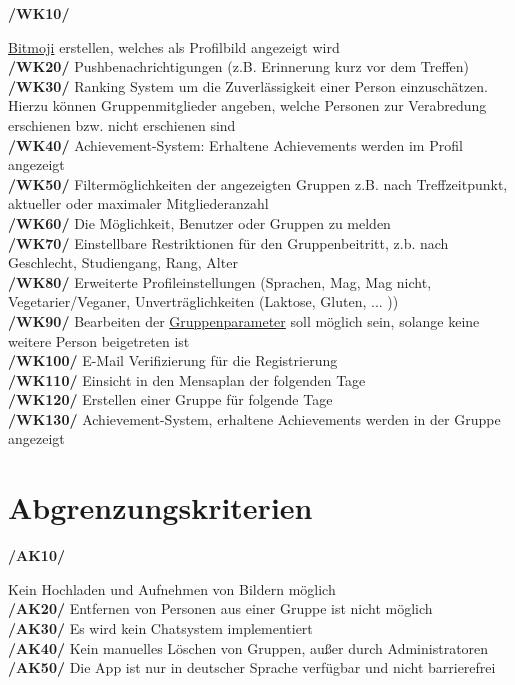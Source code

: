 \documentclass[a4paper]{scrreprt}
\begin{document}
\begin{addmargin}[25pt]{0pt}
\hypertarget{wk10}{\textbf{/WK10/}} \hyperlink{label7}{Bitmoji} erstellen, welches als Profilbild angezeigt wird \\
\hypertarget{wk20}{\textbf{/WK20/}} Pushbenachrichtigungen (z.B. Erinnerung kurz vor dem Treffen) \\
\hypertarget{wk30}{\textbf{/WK30/}} Ranking System um die Zuverlässigkeit einer Person einzuschätzen.\\
Hierzu können Gruppenmitglieder angeben, welche Personen zur Verabredung erschienen bzw. nicht erschienen sind\\
\hypertarget{wk40}{\textbf{/WK40/}} Achievement-System: Erhaltene Achievements werden im Profil angezeigt\\
\hypertarget{wk50}{\textbf{/WK50/}} Filtermöglichkeiten der angezeigten Gruppen z.B. nach Treffzeitpunkt, aktueller oder maximaler Mitgliederanzahl \\
\hypertarget{wk60}{\textbf{/WK60/}} Die Möglichkeit, Benutzer oder Gruppen zu melden\\
\hypertarget{wk70}{\textbf{/WK70/}} Einstellbare Restriktionen für den Gruppenbeitritt, z.b. nach Geschlecht, Studiengang, Rang, Alter \\
\hypertarget{wk80}{\textbf{/WK80/}} Erweiterte Profileinstellungen (Sprachen, Mag, Mag nicht, Vegetarier/Veganer, Unverträglichkeiten (Laktose, Gluten, ... ))\\
\hypertarget{wk90}{\textbf{/WK90/}} Bearbeiten der \hyperlink{label2}{Gruppenparameter} soll möglich sein, solange keine weitere Person beigetreten ist\\
\hypertarget{wk100}{\textbf{/WK100/}} E-Mail Verifizierung für die Registrierung\\
\hypertarget{wk110}{\textbf{/WK110/}} Einsicht in den Mensaplan der folgenden Tage\\
\hypertarget{wk120}{\textbf{/WK120/}} Erstellen einer Gruppe für folgende Tage\\
\hypertarget{wk130}{\textbf{/WK130/}} Achievement-System, erhaltene Achievements werden in der Gruppe angezeigt\\
\end{addmargin}

\section{Abgrenzungskriterien}

\begin{addmargin}[25pt]{0pt}
\hypertarget{ak10}{\textbf{/AK10/}} Kein Hochladen und Aufnehmen von Bildern möglich\\
\hypertarget{ak20}{\textbf{/AK20/}} Entfernen von Personen aus einer Gruppe ist nicht möglich\\
\hypertarget{ak30}{\textbf{/AK30/}} Es wird kein Chatsystem implementiert\\
\hypertarget{ak40}{\textbf{/AK40/}} Kein manuelles Löschen von Gruppen, außer durch Administratoren\\
\hypertarget{ak50}{\textbf{/AK50/}} Die App ist nur in deutscher Sprache verfügbar und nicht barrierefrei\\
\end{addmargin}
\end{document}
